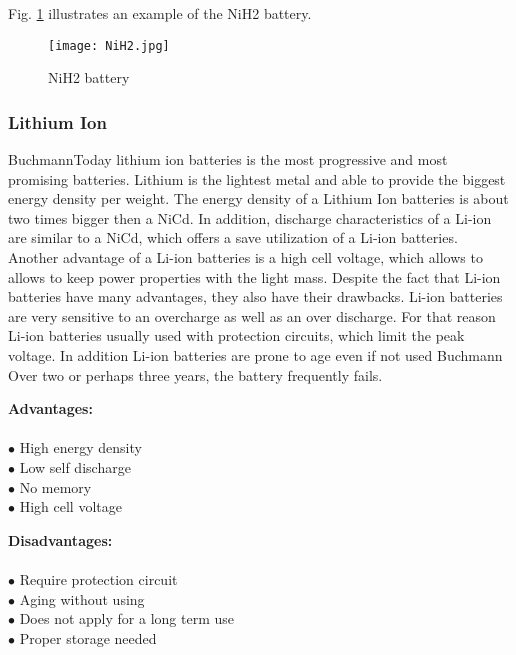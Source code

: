 Fig. \ref{fig: nih2} illustrates an example of the NiH2 battery. 


\begin{figure}[h]
	\centering
	\texttt{[image: NiH2.jpg]}
	\caption{ NiH2 battery \cite{10}}
	\label{fig: nih2}
\end{figure}

\subsubsection{Lithium Ion \label{sec:tech}}

Buchmann\cite{7}Today lithium ion batteries is the most progressive and most promising batteries. Lithium is the lightest metal and able to provide the biggest energy density per weight. The energy density of a Lithium Ion batteries is about two times bigger then a NiCd. In addition, discharge characteristics of a Li-ion are similar to a NiCd, which offers a save utilization of a Li-ion batteries. Another advantage of a Li-ion batteries is a high cell voltage, which allows to allows to keep power properties with the light mass. Despite the fact that Li-ion batteries have many advantages, they also have their drawbacks. Li-ion batteries are very sensitive to an overcharge as well as an over discharge. For that reason Li-ion batteries usually used with protection circuits, which limit the peak voltage. In addition Li-ion batteries are prone to age even if not used Buchmann\cite{7} Over two or perhaps three years, the battery frequently fails.


\begin{multicols}{2}
	
	\textbf{Advantages:} \\ \\
	$\bullet$ High energy density\\
	$\bullet$ Low self discharge\\
	$\bullet$ No memory\\
	$\bullet$ High cell voltage\\
	
	
	
	
	\columnbreak
	
	\textbf{Disadvantages:} \\ \\
	$\bullet$ Require protection circuit\\
	$\bullet$ Aging without using\\
	$\bullet$ Does not apply for a long term use\\
	$\bullet$ Proper storage needed 

	
	
\end{multicols}

